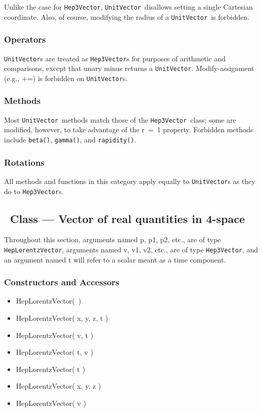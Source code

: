 \documentclass[twoside,12pt]{article}
\def \SV {{\tt Hep3Vector}}
\def \UV {{\tt UnitVector}}
\def \LV {{\tt HepLorentzVector}}
\newenvironment{shortlist}{%
\begin{itemize}
\setlength{\itemsep}{0pt}
\setlength{\parskip}{0pt}
}{%
\end{itemize}
}
\begin{document}
\noindent
Unlike the case for \SV , \UV\ disallows setting a
single Cartesian coordinate.  Also, of course,
modifying the radius of a \UV\ is forbidden.

\subsubsection{Operators}

\UV s are treated as \SV s for purposes of arithmetic and comparisons,
except that unary minus returns a \UV .
Modify-assignment (e.g., +=) is forbidden on \UV s.

\subsubsection{Methods}
\label{unitMethods}

Most \UV\ methods match those of the \SV\ class; some are modified,
however, to take advantage of the r~=~1 property.
Forbidden methods include
\verb|beta()|, \verb|gamma()|, and \verb|rapidity()|.

\subsubsection{Rotations}

All methods and functions in this category apply equally to
\UV s as they do to \SV s.



\subsection{\protect\LV\ Class --- Vector of real quantities in 4-space}

Throughout this section,
arguments named p, p1, p2, etc., are of type \LV ,
arguments named v, v1, v2, etc., are of type \SV ,
and an argument named t will refer to a scalar meant as a time component.

\subsubsection{Constructors and Accessors}

\begin{shortlist}
  \item HepLorentzVector(~)
  \item HepLorentzVector( x, y, z, t )
  \item HepLorentzVector( v, t )
  \item HepLorentzVector( t, v )
  \item HepLorentzVector( t )
  \item HepLorentzVector( x, y, z )
  \item HepLorentzVector( v )
\end{shortlist}
\end{document}
